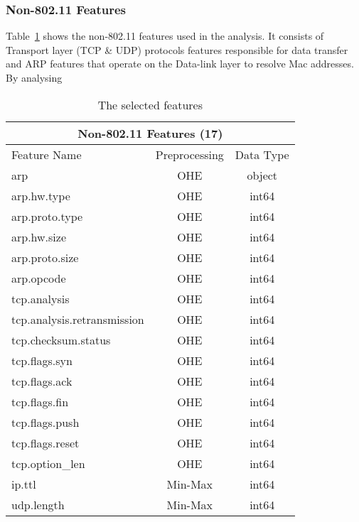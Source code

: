 \subsubsection{Non-802.11 Features}

Table~\ref{tab:non80211} shows the non-802.11 features used in the analysis. It consists of Transport layer (TCP \& UDP) protocols features responsible for data transfer and ARP features that operate on the Data-link layer to resolve Mac addresses. By analysing 

\begin{table}[H]
\begin{tabular}{lcc}
\hline
\multicolumn{3}{c}{\textbf{Non-802.11 Features (17)}} \\ \hline
Feature Name & Preprocessing & Data Type \\ \hline
arp & OHE & object \\
arp.hw.type & OHE & int64 \\
arp.proto.type & OHE & int64 \\
arp.hw.size & OHE & int64 \\
arp.proto.size & OHE & int64 \\
arp.opcode & OHE & int64 \\
tcp.analysis & OHE & int64 \\
tcp.analysis.retransmission & OHE & int64 \\
tcp.checksum.status & OHE & int64 \\
tcp.flags.syn & OHE & int64 \\
tcp.flags.ack & OHE & int64 \\
tcp.flags.fin & OHE & int64 \\
tcp.flags.push & OHE & int64 \\
tcp.flags.reset & OHE & int64 \\
tcp.option\_len & OHE & int64 \\
ip.ttl & Min-Max & int64 \\
udp.length & Min-Max & int64 \\ \hline
\end{tabular}
\caption{The selected features}
\label{tab:non80211}
\end{table}
